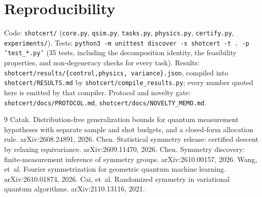 \documentclass{article}
\begin{document}



\section*{Reproducibility}

Code: \texttt{shotcert/} (\texttt{core.py}, \texttt{qsim.py}, \texttt{tasks.py}, \texttt{physics.py},
\texttt{certify.py}, \texttt{experiments/}). Tests: \texttt{python3 -m unittest discover -s shotcert
-t . -p 'test\_*.py'} (35 tests, including the decomposition identity, the feasibility properties,
and non-degeneracy checks for every task). Results: \texttt{shotcert/results/\{control,physics,
variance\}.json}, compiled into \texttt{shotcert/RESULTS.md} by
\texttt{shotcert/compile\_results.py}; every number quoted here is emitted by that compiler.
Protocol and novelty gate: \texttt{shotcert/docs/PROTOCOL.md}, \texttt{shotcert/docs/NOVELTY\_MEMO.md}.


\begin{thebibliography}{9}
 Catak. Distribution-free generalization bounds for quantum
measurement hypotheses with separate sample and shot budgets, and a closed-form allocation rule.
arXiv:2608.24891, 2026.
 Chen. Statistical symmetry release: certified descent by
relaxing equivariance. arXiv:2609.11470, 2026.
 Chen. Symmetry discovery: finite-measurement inference of
symmetry groups. arXiv:2610.00157, 2026.
 Wang, et~al. Fourier symmetrization for geometric
quantum machine learning. arXiv:2610.01874, 2026.
 Cai, et~al. Randomized symmetry in variational quantum
algorithms. arXiv:2110.13116, 2021.
\end{thebibliography}
\end{document}
